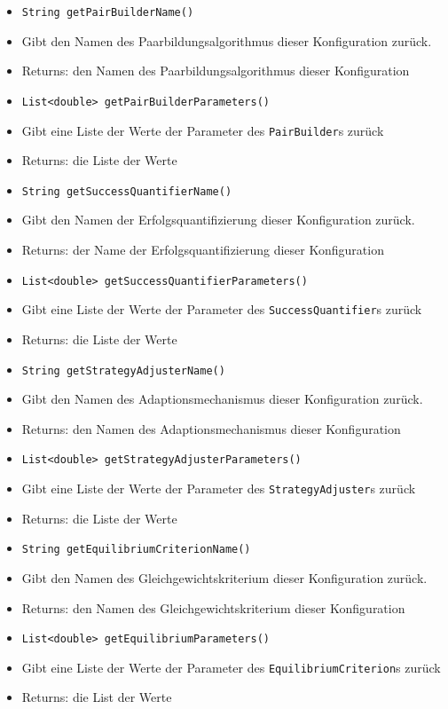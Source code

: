 \documentclass[parskip=full,11pt]{scrartcl}
\begin{document}
\begin{itemize}
	\item \texttt{String getPairBuilderName()}
	\item[] Gibt den Namen des  Paarbildungsalgorithmus dieser Konfiguration zurück.
	\item[] Returns: den Namen des Paarbildungsalgorithmus dieser Konfiguration
	
	\item \texttt{List<double> getPairBuilderParameters()}
	\item[] Gibt eine Liste der Werte der Parameter des \texttt{PairBuilder}s zurück
	\item[] Returns: die Liste der Werte
	
	\item \texttt{String getSuccessQuantifierName()}
	\item[] Gibt den Namen der Erfolgsquantifizierung dieser Konfiguration zurück.
	\item[] Returns: der Name der Erfolgsquantifizierung dieser Konfiguration
	
	\item \texttt{List<double> getSuccessQuantifierParameters()}
	\item[] Gibt eine Liste der Werte der Parameter des \texttt{SuccessQuantifier}s zurück
	\item[] Returns: die Liste der Werte
	
	\item \texttt{String getStrategyAdjusterName()}
	\item[] Gibt den Namen des Adaptionsmechanismus dieser Konfiguration zurück.
	\item[] Returns: den Namen des Adaptionsmechanismus dieser Konfiguration
	
	\item \texttt{List<double> getStrategyAdjusterParameters()}
	\item[] Gibt eine Liste der Werte der Parameter des \texttt{StrategyAdjuster}s zurück
	\item[] Returns: die Liste der Werte
	
	
	\item \texttt{String getEquilibriumCriterionName()}
	\item[] Gibt den Namen des  Gleichgewichtskriterium dieser Konfiguration zurück.
	\item[] Returns: den Namen des Gleichgewichtskriterium dieser Konfiguration
	
	\item \texttt{List<double> getEquilibriumParameters()}
	\item[] Gibt eine Liste der Werte der Parameter des \texttt{EquilibriumCriterion}s zurück
	\item[] Returns: die List der Werte
	

\end{itemize}
\end{document}
